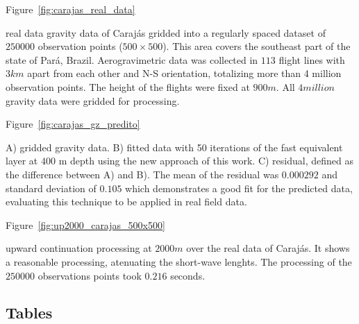 \documentclass[paper]{geophysics}
\begin{document}
Figure~\ref{fig:carajas_real_data}

{real data gravity data of Caraj\'as gridded into a regularly spaced dataset of $250000$ observation points ($500 \times 500$). This area covers the southeast part of the state of Par\'a, Brazil. Aerogravimetric data was collected in $113$ flight lines with $3 km$ apart from each other and N-S orientation, totalizing more than 4 million observation points. The height of the flights were fixed at $900 m$. All $4 million$ gravity data were gridded for processing.}
\newpage

Figure~\ref{fig:carajas_gz_predito}

{A) gridded gravity data. B) fitted data with 50 iterations of the fast equivalent layer at $400$ m depth using the new approach of this work. C) residual, defined as the difference between A) and B). The mean of the residual was $0.000292$ and standard deviation of $0.105$ which demonstrates a good fit for the predicted data, evaluating this technique to be applied in real field data.}
\newpage

Figure~\ref{fig:up2000_carajas_500x500}

{upward continuation processing at $2000 m$ over the real data of Caraj\'as. It shows a reasonable processing, atenuating the short-wave lenghts. The processing of the $250000$ observations points took $0.216$ seconds.}
\newpage

%
%

\subsection{Tables}
\end{document}
